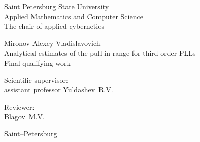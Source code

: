 
\begin{titlepage}
\begin{center}
\normalsize{Saint Petersburg State University}\\
\normalsize{Applied Mathematics and Computer Science}\\
\normalsize{The chair of applied cybernetics}

\vspace{35mm}

\normalsize{Mironov Alexey Vladislavovich} \\[8mm]
\large{Analytical estimates of the pull-in range for third-order PLLs}\\[3mm]
\small{Final qualifying work}

\vspace{50mm}

\begin{flushright}
{Scientific supervisor:} \\
assistant professor Yuldashev~R.\:V.
\end{flushright}
\begin{flushright}
{Reviewer:} \\
Blagov~M.\:V.
\end{flushright}

\vfill 

{Saint--Petersburg}
\par{\number\year}
\end{center}
\end{titlepage}
\restoregeometry
\addtocounter{page}{1}